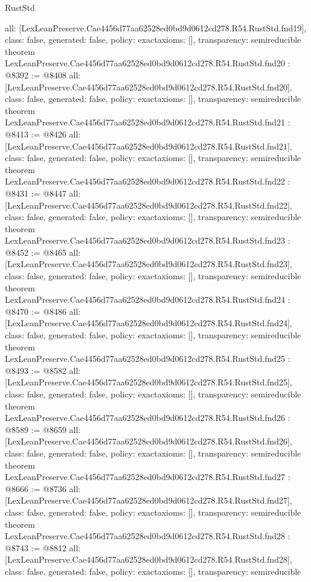 \begin{lexlean}{RustStd}
\begin{coremodule}
{  all: [LexLeanPreserve.Cae4456d77aa62528ed0bd9d0612cd278.R54.RustStd.fnd19],
  class: false,
  generated: false,
  policy: exact{axioms: []},
  transparency: semireducible
}
theorem LexLeanPreserve.Cae4456d77aa62528ed0bd9d0612cd278.R54.RustStd.fnd20 : @8392 := @8408 {
  all: [LexLeanPreserve.Cae4456d77aa62528ed0bd9d0612cd278.R54.RustStd.fnd20],
  class: false,
  generated: false,
  policy: exact{axioms: []},
  transparency: semireducible
}
theorem LexLeanPreserve.Cae4456d77aa62528ed0bd9d0612cd278.R54.RustStd.fnd21 : @8413 := @8426 {
  all: [LexLeanPreserve.Cae4456d77aa62528ed0bd9d0612cd278.R54.RustStd.fnd21],
  class: false,
  generated: false,
  policy: exact{axioms: []},
  transparency: semireducible
}
theorem LexLeanPreserve.Cae4456d77aa62528ed0bd9d0612cd278.R54.RustStd.fnd22 : @8431 := @8447 {
  all: [LexLeanPreserve.Cae4456d77aa62528ed0bd9d0612cd278.R54.RustStd.fnd22],
  class: false,
  generated: false,
  policy: exact{axioms: []},
  transparency: semireducible
}
theorem LexLeanPreserve.Cae4456d77aa62528ed0bd9d0612cd278.R54.RustStd.fnd23 : @8452 := @8465 {
  all: [LexLeanPreserve.Cae4456d77aa62528ed0bd9d0612cd278.R54.RustStd.fnd23],
  class: false,
  generated: false,
  policy: exact{axioms: []},
  transparency: semireducible
}
theorem LexLeanPreserve.Cae4456d77aa62528ed0bd9d0612cd278.R54.RustStd.fnd24 : @8470 := @8486 {
  all: [LexLeanPreserve.Cae4456d77aa62528ed0bd9d0612cd278.R54.RustStd.fnd24],
  class: false,
  generated: false,
  policy: exact{axioms: []},
  transparency: semireducible
}
theorem LexLeanPreserve.Cae4456d77aa62528ed0bd9d0612cd278.R54.RustStd.fnd25 : @8493 := @8582 {
  all: [LexLeanPreserve.Cae4456d77aa62528ed0bd9d0612cd278.R54.RustStd.fnd25],
  class: false,
  generated: false,
  policy: exact{axioms: []},
  transparency: semireducible
}
theorem LexLeanPreserve.Cae4456d77aa62528ed0bd9d0612cd278.R54.RustStd.fnd26 : @8589 := @8659 {
  all: [LexLeanPreserve.Cae4456d77aa62528ed0bd9d0612cd278.R54.RustStd.fnd26],
  class: false,
  generated: false,
  policy: exact{axioms: []},
  transparency: semireducible
}
theorem LexLeanPreserve.Cae4456d77aa62528ed0bd9d0612cd278.R54.RustStd.fnd27 : @8666 := @8736 {
  all: [LexLeanPreserve.Cae4456d77aa62528ed0bd9d0612cd278.R54.RustStd.fnd27],
  class: false,
  generated: false,
  policy: exact{axioms: []},
  transparency: semireducible
}
theorem LexLeanPreserve.Cae4456d77aa62528ed0bd9d0612cd278.R54.RustStd.fnd28 : @8743 := @8812 {
  all: [LexLeanPreserve.Cae4456d77aa62528ed0bd9d0612cd278.R54.RustStd.fnd28],
  class: false,
  generated: false,
  policy: exact{axioms: []},
  transparency: semireducible
}
\end{coremodule}
\end{lexlean}
